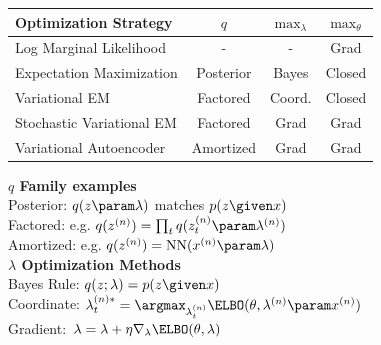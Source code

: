 \begin{frame}
\vspace{-4mm}
\begin{table}[]
    \centering
    \small
    \begin{tabular}{l c c c }
    \toprule
        Optimization Strategy  & $q$ &  $\max_\lambda$ & $\max_\theta$ \\
    \midrule
         Log Marginal Likelihood & - & - & Grad \\
         Expectation Maximization & Posterior & Bayes & Closed \\
         Variational EM &  Factored & Coord. & Closed \\
         Stochastic Variational EM  & Factored  & Grad & Grad\\
         Variational Autoencoder & Amortized & Grad & Grad \\
         \bottomrule
    \end{tabular}
\end{table}
\vspace{-2mm}
\textbf{$q$ Family examples} \\
Posterior: $q(z\param \lambda)$ matches $p(z \given x)$\\
Factored: e.g. $q(z^{(n)}) = \prod_{t} q(z^{(n)}_t\param \lambda^{(n)})$ \\
Amortized: e.g. $q(z^{(n)}) = \text{NN}(x^{(n)}\param \lambda)$  \\
\textbf{$\lambda$ Optimization Methods} \\
Bayes Rule: $q(z;\lambda) = p(z \given x )$ \\
Coordinate: $\lambda^{(n)*}_t = \argmax_{\lambda^{(n)}_t} \ELBO(\theta, \lambda^{(n)} \param x^{(n)}) $ \\
Gradient:\ $\lambda = \lambda + \eta \nabla_\lambda \ELBO(\theta, \lambda)$ \\
\end{frame}

\begin{frame}
    
\end{frame}


